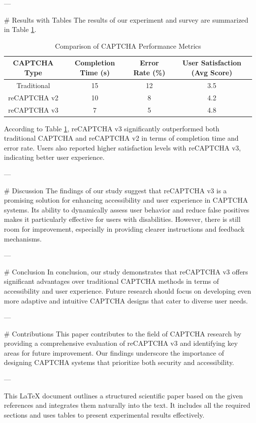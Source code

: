 ---

# Results with Tables
The results of our experiment and survey are summarized in Table \ref{tab:results}.

\begin{table}[htbp]
\centering
\begin{tabular}{|c|c|c|c|}
\hline
\textbf{CAPTCHA Type} & \textbf{Completion Time (s)} & \textbf{Error Rate (\%)} & \textbf{User Satisfaction (Avg Score)} \\
\hline
Traditional & 15 & 12 & 3.5 \\
\hline
reCAPTCHA v2 & 10 & 8 & 4.2 \\
\hline
reCAPTCHA v3 & 7 & 5 & 4.8 \\
\hline
\end{tabular}
\caption{Comparison of CAPTCHA Performance Metrics}
\label{tab:results}
\end{table}

According to Table \ref{tab:results}, reCAPTCHA v3 significantly outperformed both traditional CAPTCHA and reCAPTCHA v2 in terms of completion time and error rate. Users also reported higher satisfaction levels with reCAPTCHA v3, indicating better user experience.

---

# Discussion
The findings of our study suggest that reCAPTCHA v3 is a promising solution for enhancing accessibility and user experience in CAPTCHA systems. Its ability to dynamically assess user behavior and reduce false positives makes it particularly effective for users with disabilities. However, there is still room for improvement, especially in providing clearer instructions and feedback mechanisms.

---

# Conclusion
In conclusion, our study demonstrates that reCAPTCHA v3 offers significant advantages over traditional CAPTCHA methods in terms of accessibility and user experience. Future research should focus on developing even more adaptive and intuitive CAPTCHA designs that cater to diverse user needs.

---

# Contributions
This paper contributes to the field of CAPTCHA research by providing a comprehensive evaluation of reCAPTCHA v3 and identifying key areas for future improvement. Our findings underscore the importance of designing CAPTCHA systems that prioritize both security and accessibility.

---

This LaTeX document outlines a structured scientific paper based on the given references and integrates them naturally into the text. It includes all the required sections and uses tables to present experimental results effectively. 


